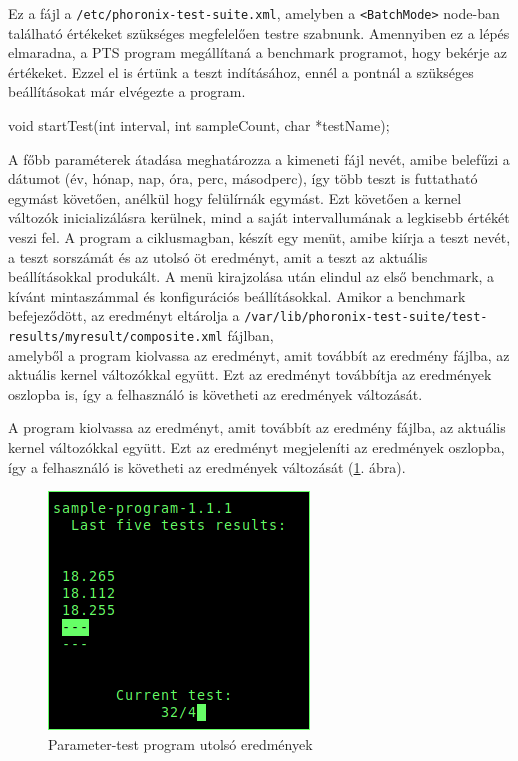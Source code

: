 Ez a fájl a \texttt{/etc/phoronix-test-suite.xml}, amelyben a \texttt{<BatchMode>} node-ban található értékeket szükséges megfelelően testre szabnunk. Amennyiben ez a lépés elmaradna, a PTS program megállítaná a benchmark programot, hogy bekérje az értékeket. Ezzel el is értünk a teszt indításához, ennél a pontnál a szükséges beállításokat már elvégezte a program.
\begin{cpp}
void startTest(int interval, int sampleCount, char *testName);
\end{cpp}
A főbb paraméterek átadása meghatározza a kimeneti fájl nevét, amibe belefűzi a dátumot (év, hónap, nap, óra, perc, másodperc), így több teszt is futtatható egymást követően, anélkül hogy felülírnák egymást.
Ezt követően a kernel változók inicializálásra kerülnek, mind a saját intervallumának a legkisebb értékét veszi fel. A program a ciklusmagban, készít egy menüt, amibe kiírja a teszt nevét, a teszt sorszámát és az utolsó öt eredményt, amit a teszt az aktuális beállításokkal produkált. A menü kirajzolása után elindul az első benchmark, a kívánt mintaszámmal és konfigurációs beállításokkal. Amikor a benchmark befejeződött, az eredményt eltárolja a \texttt{/var/lib/phoronix-test-suite/test-results/myresult/composite.xml} fájlban, \\ amelyből a program kiolvassa az eredményt, amit továbbít az eredmény fájlba, az aktuális kernel változókkal együtt. Ezt az eredményt továbbítja az eredmények oszlopba is, így a felhasználó is követheti az eredmények változását.

\noindent A program kiolvassa az eredményt, amit továbbít az eredmény fájlba, az aktuális kernel változókkal együtt. Ezt az eredményt megjeleníti az eredmények oszlopba, így a felhasználó is követheti az eredmények változását (\ref{fig:parameter-test}. ábra).

\begin{figure}[h!]
\centering
\includegraphics[scale=3.0]{images/parameter-test.png}
\caption{Parameter-test program utolsó eredmények}
\label{fig:parameter-test}
\end{figure}

